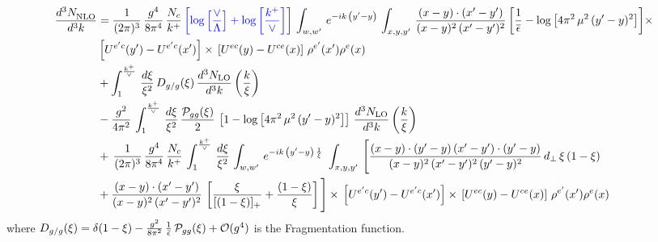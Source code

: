 \documentclass[9pt]{article}
\numberwithin{equation}{section}
\begin{document}
\begingroup\color{red}\begin{align}
    \frac{d^{3}N_{\rm NLO}^{\rm}}{d^{3}k}  & = \frac{1}{(2\pi)^{3}}\,\frac{g^{4}}{8\pi^{4}}\,\frac{N_{c}}{k^{+}}\,{\color{blue}\left[\log{\left[\frac{\vee}{\Lambda}\right]}+\log{\left[\frac{k^{+}}{\vee}\right]}\right]}\,\int_{w,w^{\prime}}\,e^{-ik\,\left(y'-y\right)}\,\int_{x,y,y^{\prime}}\,\frac{(x-y)\cdot(x'-y')}{(x-y)^{2}\,(x'-y')^{2}}\, \bigg[\frac{1}{\overline{\epsilon}} -\log{\left[4\pi^{2}\,\mu^{2}\,(y'-y)^{2}\right]}\bigg]\times\notag \\ &  \left[U^{e'c}(y') - U^{e'c}(x')\right] \times\, \left[U^{ec}(y) - U^{ce}(x)\right]\, \rho^{e'}(x') \rho^{e}(x) \notag \\ & + \int_{1}^{\frac{k^{+}}{\vee}}\, \frac{d\xi}{\xi^{2}}\,D_{g/g}(\xi)\,\frac{d^{3}N_{\mathrm{LO}}}{d^{3}k}\left(\frac{k}{\xi}\right)\notag \\ & - \frac{g^{2}}{4\pi^{2}}\,\int_{1}^{\frac{k^{+}}{\vee}}\, \frac{d\xi}{\xi^{2}}\,\frac{\mathcal{P}_{gg}(\xi)}{2}\,\left[1 -\log{\left[4\pi^{2}\,\mu^{2}\,(y'-y)^{2}\right]}\right]\,\frac{d^{3}N_{\mathrm{LO}}}{d^{3}k}\left(\frac{k}{\xi}\right)\notag \\ &
     +\, \frac{1}{(2\pi)^{3}}\,\frac{g^{4}}{8\pi^{4}}\,\frac{N_{c}}{k^{+}}\,\int_{1}^{\frac{k^{+}}{\vee}}\, \frac{d\xi}{\xi^{2}}\,\int_{w,w^{\prime}}\,e^{-ik\,\left(y'-y\right)\,\frac{1}{\xi}}\,\,\int_{x,y,y^{\prime}}\,\Bigg[\frac{(x-y)\cdot (y'-y)\, (x'-y')\cdot (y'-y)}{(x-y)^{2}\,(x'-y')^{2}\,(y'-y)^{2}}\,d_{\perp}\, \xi\,(1-\xi)  \notag \\ & +\frac{(x-y)\cdot(x'-y')}{(x-y)^{2}\,(x'-y')^{2}}\,\left[\frac{\xi}{[(1-\xi)]_{+}}+\frac{(1-\xi)}{\xi}\right] \Bigg]\times\,\left[U^{e'c}(y') - U^{e'c}(x')\right] \times\, \left[U^{ec}(y) - U^{ce}(x)\right]\, \rho^{e'}(x') \rho^{e}(x)
\end{align}\endgroup
\begingroup\color{red}where $ D_{g/g}(\xi)  = \delta(1-\xi) - \frac{g^{2}}{8\pi^{2}}\, \frac{1}{\Bar{\epsilon}}\,\mathcal{P}_{gg}(\xi) + \mathcal{O}(g^{4}) $ is the Fragmentation function. \endgroup
\end{document}
